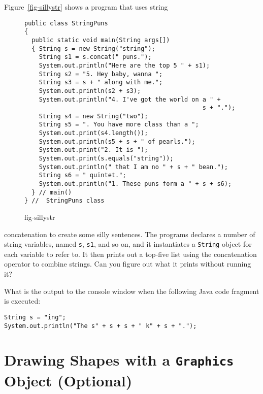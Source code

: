 Figure~\ref{fig-sillystr} shows a program that uses string
\begin{figure}[h!]
\jjjprogstart
\begin{jjjlisting}
\begin{lstlisting}
public class StringPuns 
{
  public static void main(String args[]) 
  { String s = new String("string");
    String s1 = s.concat(" puns.");
    System.out.println("Here are the top 5 " + s1);
    String s2 = "5. Hey baby, wanna ";
    String s3 = s + " along with me.";
    System.out.println(s2 + s3);
    System.out.println("4. I've got the world on a " + 
                                                 s + ".");
    String s4 = new String("two");
    String s5 = ". You have more class than a ";
    System.out.print(s4.length());
    System.out.println(s5 + s + " of pearls.");
    System.out.print("2. It is ");
    System.out.print(s.equals("string"));
    System.out.println(" that I am no " + s + " bean.");
    String s6 = " quintet.";
    System.out.println("1. These puns form a " + s + s6);        
  } // main()
} //  StringPuns class
\end{lstlisting}
\end{jjjlisting}
{fig-sillystr}
\end{figure}
concatenation to create some silly sentences.  The programs declares a
number of string variables, named {\tt s}, {\tt s1}, and so on, and
it instantiates a {\tt String} object for each variable to refer to.
It then prints out a top-five list using the concatenation operator to
combine strings. Can you figure out what it prints without running it?



\begin{SSTUDY}

\item
What is the output to the console window when the following
Java code fragment is executed:

\begin{jjjlisting}
\begin{lstlisting}
String s = "ing";
System.out.println("The s" + s + s + " k" + s + ".");
\end{lstlisting}
\end{jjjlisting}

\end{SSTUDY}


\section{Drawing Shapes with a {\tt Graphics} Object (Optional)}


